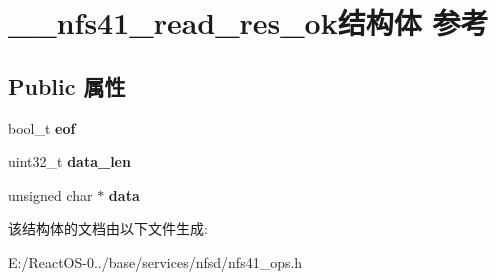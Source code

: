 \hypertarget{struct____nfs41__read__res__ok}{}\section{\+\_\+\+\_\+nfs41\+\_\+read\+\_\+res\+\_\+ok结构体 参考}
\label{struct____nfs41__read__res__ok}
\subsection*{Public 属性}
\begin{DoxyCompactItemize}
\item 
\mbox{\label{struct____nfs41__read__res__ok_a7db694c9c12596f3bafc95308b319b96}} 
bool\+\_\+t {\bfseries eof}
\item 
\mbox{\label{struct____nfs41__read__res__ok_a155c2ad58436424d1de6e5b7f27241b4}} 
uint32\+\_\+t {\bfseries data\+\_\+len}
\item 
\mbox{\label{struct____nfs41__read__res__ok_a9201144bb1d4c5ee4507600e7b7af595}} 
unsigned char $\ast$ {\bfseries data}
\end{DoxyCompactItemize}


该结构体的文档由以下文件生成\+:\begin{DoxyCompactItemize}
\item 
E\+:/\+React\+O\+S-\/0../base/services/nfsd/nfs41\+\_\+ops.\+h\end{DoxyCompactItemize}
